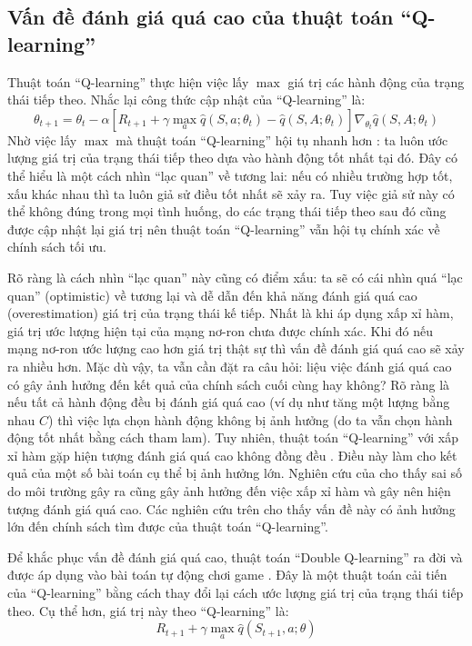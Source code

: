 \subsection{Vấn đề đánh giá quá cao của thuật toán ``Q-learning''}
	Thuật toán ``Q-learning'' thực hiện việc lấy $\max$ giá trị các hành động của trạng thái tiếp theo.
	Nhắc lại công thức cập nhật của ``Q-learning'' là:
	\begin{equation}
		\theta_{t+1} = \theta_t - \alpha \left[ R_{t+1} + \gamma \max_{a}\hat{q}(S, a;\theta_t) - \hat{q}(S,A;\theta_t) \right] \nabla_{\theta_t} \hat{q}(S, A;\theta_t)	
	\end{equation}
	Nhờ việc lấy $\max$ mà thuật toán ``Q-learning'' hội tụ nhanh hơn \cite{sutton1998introduction}: ta luôn ước lượng giá trị của trạng thái tiếp theo dựa vào hành động tốt nhất tại đó.
	Đây có thể hiểu là một cách nhìn ``lạc quan'' về tương lai: nếu có nhiều trường hợp tốt, xấu khác nhau thì ta luôn giả sử điều tốt nhất sẽ xảy ra.
	Tuy việc giả sử này có thể không đúng trong mọi tình huống, do các trạng thái tiếp theo sau đó cũng được cập nhật lại giá trị nên thuật toán ``Q-learning'' vẫn hội tụ chính xác về chính sách tối ưu.
	
	Rõ ràng là cách nhìn ``lạc quan'' này cũng có điểm xấu: ta sẽ có cái nhìn quá ``lạc quan'' (optimistic) về tương lại và dễ dẫn đến khả năng đánh giá quá cao (overestimation) giá trị của trạng thái kế tiếp.
	Nhất là khi áp dụng xấp xỉ hàm, giá trị ước lượng hiện tại của mạng nơ-ron chưa được chính xác.
	Khi đó nếu mạng nơ-ron ước lượng cao hơn giá trị thật sự thì vấn đề đánh giá quá cao sẽ xảy ra nhiều hơn.
	Mặc dù vậy, ta vẫn cần đặt ra câu hỏi: liệu việc đánh giá quá cao có gây ảnh hưởng đến kết quả của chính sách cuối cùng hay không?
	Rõ ràng là nếu tất cả hành động đều bị đánh giá quá cao (ví dụ như tăng một lượng bằng nhau $C$) thì việc lựa chọn hành động không bị ảnh hưởng (do ta vẫn chọn hành động tốt nhất bằng cách tham lam).
	Tuy nhiên, thuật toán ``Q-learning'' với xấp xỉ hàm gặp hiện tượng đánh giá quá cao không đồng đều \cite{van2015deep}.
	Điều này làm cho kết quả của một số bài toán cụ thể bị ảnh hưởng lớn.
	Nghiên cứu của \cite{hasselt2010double} cho thấy sai số do môi trường gây ra cũng gây ảnh hưởng đến việc xấp xỉ hàm và gây nên hiện tượng đánh giá quá cao.
	Các nghiên cứu trên cho thấy vấn đề này có ảnh hưởng lớn đến chính sách tìm được của thuật toán ``Q-learning''.
	
	Để khắc phục vấn đề đánh giá quá cao, thuật toán ``Double Q-learning'' \cite{hasselt2010double} ra đời và được áp dụng vào bài toán tự động chơi game \cite{van2015deep}.
	Đây là một thuật toán cải tiến của ``Q-learning'' bằng cách thay đổi lại cách ước lượng giá trị của trạng thái tiếp theo.
	Cụ thể hơn, giá trị này theo ``Q-learning'' là: 
	\begin{equation}
		\label{eq_q_max_target}
		R_{t+1} + \gamma \max_{a}\hat{q}(S_{t+1}, a;\theta)
	\end{equation}
	
